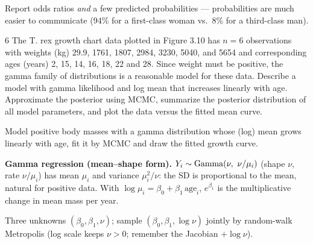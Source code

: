 \documentclass[11pt]{article}
\begin{document}
\begin{takeaway}
Report odds ratios \emph{and} a few predicted probabilities --- probabilities are much easier to communicate (94\% for a first-class woman vs.\ 8\% for a third-class man).
\end{takeaway}


\begin{problem}{6}
The T. rex growth chart data plotted in Figure 3.10 has $n=6$ observations with weights (kg) 29.9, 1761, 1807, 2984, 3230, 5040, and 5654 and corresponding ages (years) 2, 15, 14, 16, 18, 22 and 28. Since weight must be positive, the gamma family of distributions is a reasonable model for these data. Describe a model with gamma likelihood and log mean that increases linearly with age. Approximate the posterior using MCMC, summarize the posterior distribution of all model parameters, and plot the data versus the fitted mean curve.
\end{problem}

\begin{restate}
Model positive body masses with a gamma distribution whose (log) mean grows linearly with age, fit it by MCMC and draw the fitted growth curve.
\end{restate}

\begin{recall}
\textbf{Gamma regression (mean--shape form).} $Y_i\sim\mathrm{Gamma}(\nu,\ \nu/\mu_i)$ (shape $\nu$, rate $\nu/\mu_i$) has mean $\mu_i$ and variance $\mu_i^2/\nu$: the SD is proportional to the mean, natural for positive data. With $\log\mu_i=\beta_0+\beta_1\,\text{age}_i$, $e^{\beta_1}$ is the multiplicative change in mean mass per year.
\end{recall}

\begin{keyidea}
Three unknowns $(\beta_0,\beta_1,\nu)$; sample $(\beta_0,\beta_1,\log\nu)$ jointly by random-walk Metropolis (log scale keeps $\nu>0$; remember the Jacobian $+\log\nu$).
\end{keyidea}
\end{document}

